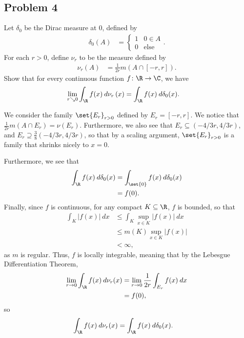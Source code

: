 \documentclass[10pt]{mypackage}
\begin{document}
\subsection{Problem 4}%
\begin{problem}
  Let $\delta_0$ be the Dirac measure at $0$, defined by
  \begin{align*}
    \delta_0(A) &= \begin{cases}
      1 & 0\in A\\
      0 & \text{else}
    \end{cases}.
  \end{align*}
  For each $r > 0$, define $\nu_r$ to be the measure defined by
  \begin{align*}
    \nu_r(A) &= \frac{1}{2r} m\left( A\cap \left[ -r,r \right] \right).
  \end{align*}
  Show that for every continuous function $f\colon \R\rightarrow \C$, we have
  \begin{align*}
    \lim_{r\searrow 0} \int_{\R}^{} f(x)\:d\nu_r\left( x \right) &= \int_{\R}^{} f(x)\:d\delta_0(x).
  \end{align*}
\end{problem}
  We consider the family $\set{E_{r}}_{r > 0}$ defined by $E_r = [-r,r]$. We notice that $\frac{1}{2r}m\left( A\cap E_r \right) = \nu\left( E_r \right)$. Furthermore, we also see that $E_r \subseteq (-4/3 r,4/3 r)$, and $E_r\supseteq \frac{3}{8} (-4/3 r,4/3 r)$, so that by a scaling argument, $\set{E_r}_{r > 0}$ is a family that shrinks nicely to $x = 0$.\newline

  Furthermore, we see that
  \begin{align*}
    \int_{\R}^{} f(x)\:d\delta_0(x) &= \int_{\set{0}}^{} f(x)\:d\delta_0(x)\\
                                    &= f(0).
  \end{align*}
  Finally, since $f$ is continuous, for any compact $K\subseteq \R$, $f$ is bounded, so that
  \begin{align*}
    \int_{K}^{} \left\vert f(x) \right\vert\:dx &\leq \int_{K}^{} \sup_{x\in K}\left\vert f(x) \right\vert\:dx\\
                                                &\leq m(K) \sup_{x\in K} \left\vert f(x) \right\vert\\
                                                &< \infty,
  \end{align*}
  as $m$ is regular. Thus, $f$ is locally integrable, meaning that by the Lebesgue Differentiation Theorem,
  \begin{align*}
    \lim_{r\rightarrow 0} \int_{\R}^{} f(x)\:d\nu_r(x) &= \lim_{r\rightarrow 0} \frac{1}{2r} \int_{E_r}^{} f(x)\:dx\\
                                                       &= f(0),
  \end{align*}
  so
  \begin{align*}
    \int_{\R}^{} f(x)\:d\nu_r(x) &= \int_{\R}^{} f(x)\:d\delta_0(x).
  \end{align*}
\end{document}
